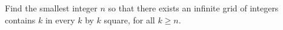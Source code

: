 Find the smallest integer $n$ so that there exists an infinite grid of integers contains $k$ in every $k$ by $k$ square, for all $k \ge n$.	
